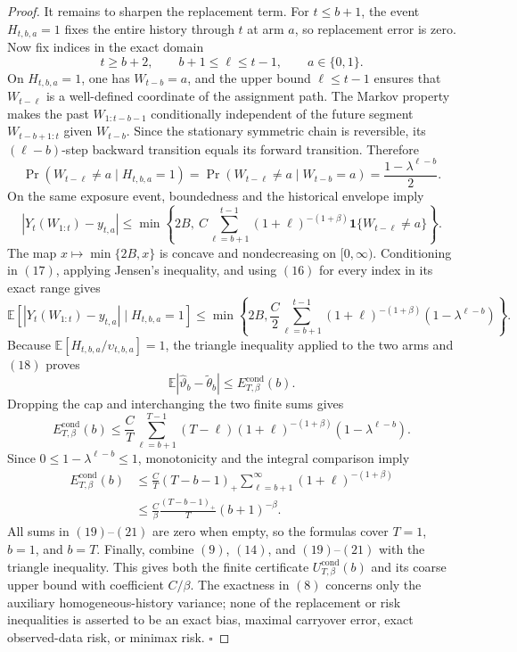 \documentclass{article}
\begin{document}
\begin{proof}
It remains to sharpen the replacement term. For \(t\le b+1\), the event \(H_{t,b,a}=1\) fixes the entire history through \(t\) at arm \(a\), so replacement error is zero. Now fix indices in the exact domain
\[
t\ge b+2,\qquad b+1\le\ell\le t-1,\qquad a\in\{0,1\}.
\tag{15}
\]
On \(H_{t,b,a}=1\), one has \(W_{t-b}=a\), and the upper bound \(\ell\le t-1\) ensures that \(W_{t-\ell}\) is a well-defined coordinate of the assignment path. The Markov property makes the past \(W_{1:t-b-1}\) conditionally independent of the future segment \(W_{t-b+1:t}\) given \(W_{t-b}\). Since the stationary symmetric chain is reversible, its \((\ell-b)\)-step backward transition equals its forward transition. Therefore
\[
\Pr(W_{t-\ell}\ne a\mid H_{t,b,a}=1)=\Pr(W_{t-\ell}\ne a\mid W_{t-b}=a)=\frac{1-\lambda^{\ell-b}}2.
\tag{16}
\]
On the same exposure event, boundedness and the historical envelope imply
\[
|Y_t(W_{1:t})-y_{t,a}|\le \min\!\left\{2B,\ C\sum_{\ell=b+1}^{t-1}(1+\ell)^{-(1+\beta)}\mathbf1\{W_{t-\ell}\ne a\}\right\}.
\tag{17}
\]
The map \(x\mapsto\min\{2B,x\}\) is concave and nondecreasing on \([0,\infty)\). Conditioning in \((17)\), applying Jensen's inequality, and using \((16)\) for every index in its exact range gives
\[
\mathbb E\!\left[|Y_t(W_{1:t})-y_{t,a}|\mid H_{t,b,a}=1\right]\le\min\!\left\{2B,\frac C2\sum_{\ell=b+1}^{t-1}(1+\ell)^{-(1+\beta)}(1-\lambda^{\ell-b})\right\}.
\tag{18}
\]
Because \(\mathbb E[H_{t,b,a}/\upsilon_{t,b,a}]=1\), the triangle inequality applied to the two arms and \((18)\) proves
\[
\mathbb E|\widehat\vartheta_b-\widetilde\theta_b|\le E_{T,\beta}^{\mathrm{cond}}(b).
\tag{19}
\]
Dropping the cap and interchanging the two finite sums gives
\[
E_{T,\beta}^{\mathrm{cond}}(b)\le\frac CT\sum_{\ell=b+1}^{T-1}(T-\ell)(1+\ell)^{-(1+\beta)}(1-\lambda^{\ell-b}).
\tag{20}
\]
Since \(0\le1-\lambda^{\ell-b}\le1\), monotonicity and the integral comparison imply
\[
\begin{aligned}
E_{T,\beta}^{\mathrm{cond}}(b)&\le\frac CT(T-b-1)_+\sum_{\ell=b+1}^{\infty}(1+\ell)^{-(1+\beta)}\\
&\le\frac C\beta\frac{(T-b-1)_+}{T}(b+1)^{-\beta}.
\end{aligned}
\tag{21}
\]
All sums in \((19)\)--\((21)\) are zero when empty, so the formulas cover \(T=1\), \(b=1\), and \(b=T\). Finally, combine \((9)\), \((14)\), and \((19)\)--\((21)\) with the triangle inequality. This gives both the finite certificate \(U_{T,\beta}^{\mathrm{cond}}(b)\) and its coarse upper bound with coefficient \(C/\beta\). The exactness in \((8)\) concerns only the auxiliary homogeneous-history variance; none of the replacement or risk inequalities is asserted to be an exact bias, maximal carryover error, exact observed-data risk, or minimax risk. \(\square\)
\end{proof}
\end{document}
